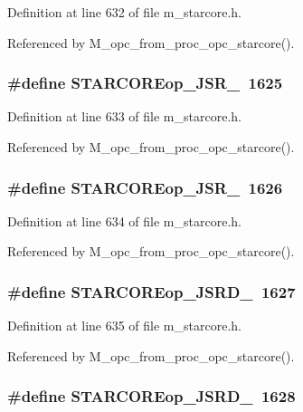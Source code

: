 Definition at line 632 of file m\_\-starcore.h.

Referenced by M\_\-opc\_\-from\_\-proc\_\-opc\_\-starcore().
\subsubsection{\setlength{\rightskip}{0pt plus 5cm}\#define STARCOREop\_\-JSR\_~1625}\label{m__starcore_8h_7897ea148a02775a14723750a8cfbd47}




Definition at line 633 of file m\_\-starcore.h.

Referenced by M\_\-opc\_\-from\_\-proc\_\-opc\_\-starcore().
\subsubsection{\setlength{\rightskip}{0pt plus 5cm}\#define STARCOREop\_\-JSR\_~1626}\label{m__starcore_8h_2b12bb0d09feb43049b29a29a7b6cd22}




Definition at line 634 of file m\_\-starcore.h.

Referenced by M\_\-opc\_\-from\_\-proc\_\-opc\_\-starcore().
\subsubsection{\setlength{\rightskip}{0pt plus 5cm}\#define STARCOREop\_\-JSRD\_~1627}\label{m__starcore_8h_549d4a206e14d7f33d4ce55ce2bab8b5}




Definition at line 635 of file m\_\-starcore.h.

Referenced by M\_\-opc\_\-from\_\-proc\_\-opc\_\-starcore().
\subsubsection{\setlength{\rightskip}{0pt plus 5cm}\#define STARCOREop\_\-JSRD\_~1628}\label{m__starcore_8h_a3015c3d45dd2820c1ff9677d40c133b}




